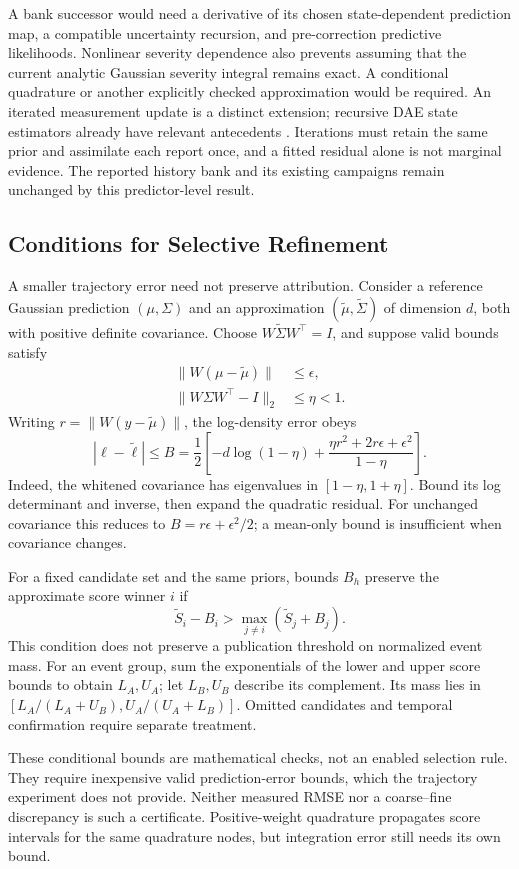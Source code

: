 A bank successor would need a derivative of its chosen state-dependent
prediction map, a compatible uncertainty recursion, and pre-correction
predictive likelihoods. Nonlinear severity dependence also prevents
assuming that the current analytic Gaussian severity integral remains
exact. A conditional quadrature or another explicitly checked approximation
would be required. An iterated measurement update is a distinct extension;
recursive DAE state estimators already have relevant antecedents
\cite{katanic2024recursive}. Iterations must retain the same prior and
assimilate each report once, and a fitted residual alone is not marginal
evidence. The reported history bank and its existing campaigns remain
unchanged by this predictor-level result.

\subsection{Conditions for Selective Refinement}
A smaller trajectory error need not preserve attribution. Consider a
reference Gaussian prediction $(\mu,\Sigma)$ and an approximation
$(\widetilde\mu,\widetilde\Sigma)$ of dimension $d$, both with positive
definite covariance. Choose $W\widetilde\Sigma W^\top=I$, and suppose
valid bounds satisfy
\begin{align}
 \|W(\mu-\widetilde\mu)\|&\leq\epsilon,\nonumber\\
 \|W\Sigma W^\top-I\|_2&\leq\eta<1.
\end{align}
Writing $r=\|W(y-\widetilde\mu)\|$, the log-density error obeys
\begin{equation}
 |\ell-\widetilde\ell|\leq
 B=\frac12\left[-d\log(1-\eta)
 +\frac{\eta r^2+2r\epsilon+\epsilon^2}{1-\eta}\right].
 \label{eq:prediction-score-bound}
\end{equation}
Indeed, the whitened covariance has eigenvalues in
$[1-\eta,1+\eta]$. Bound its log determinant and inverse, then expand
the quadratic residual. For unchanged covariance this reduces to
$B=r\epsilon+\epsilon^2/2$; a mean-only bound is insufficient when
covariance changes.

For a fixed candidate set and the same priors, bounds $B_h$ preserve
the approximate score winner $i$ if
\begin{equation}
 \widetilde S_i-B_i>
 \max_{j\ne i}(\widetilde S_j+B_j).
\end{equation}
This condition does not preserve a publication threshold on normalized
event mass. For an event group, sum the exponentials of the lower and upper
score bounds to obtain $L_A,U_A$; let $L_B,U_B$ describe its complement.
Its mass lies in $[L_A/(L_A+U_B),U_A/(U_A+L_B)]$. Omitted candidates
and temporal confirmation require separate treatment.

These conditional bounds are mathematical checks, not an enabled selection
rule. They require inexpensive valid prediction-error bounds, which the
trajectory experiment does not provide. Neither measured RMSE nor a
coarse--fine discrepancy is such a certificate. Positive-weight quadrature
propagates score intervals for the same quadrature nodes, but integration
error still needs its own bound.
